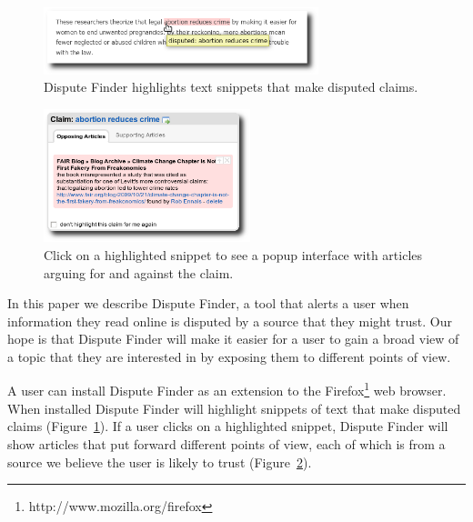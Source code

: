 \documentclass{www2010-submission}
\newcommand{\todo}[1]{}
\begin{document}
\begin{figure}[tb]
	\begin{center}
	\includegraphics[width=8cm]{pictures/highlight_abortion.png}
	\caption{Dispute Finder highlights text snippets that make disputed claims.}
	\label{highlight}
	\end{center}
\end{figure}

\begin{figure}[tb]
	\begin{center}
	\includegraphics[width=6cm]{pictures/popup_abortion_shadow.png}
	\caption{Click on a highlighted snippet to see a popup interface with articles arguing for and against the claim.}
	\label{claimview}
	\end{center}
\end{figure}
\todo{Popup interface should contain a ``don't mark this'' button}

\todo{More screenshots/graphs/visual information}

\todo{word this better}\todo{update all screenshots}

In this paper we describe Dispute Finder, a tool that alerts a user when information they read online is disputed by a source that they might trust. Our hope is that Dispute Finder will make it easier for a user to gain a broad view of a topic that they are interested in by exposing them to different points of view.

A user can install Dispute Finder as an extension to the Firefox\footnote{http://www.mozilla.org/firefox} web browser. When installed Dispute Finder will highlight snippets of text that make disputed claims (Figure~\ref{highlight}). 
If a user clicks on a highlighted snippet, Dispute Finder will show articles that put forward different points of view,  each of which is from a source we believe the user is likely to trust (Figure~\ref{claimview}). 
\end{document}
